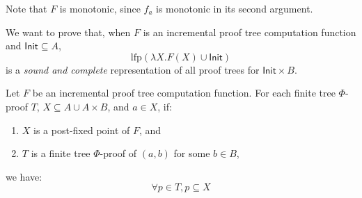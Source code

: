 \documentclass[12pt]{article}
\begin{document}
Note that $F$ is monotonic, since $f_a$ is monotonic in its second argument.

We want to prove that, when $F$ is an incremental proof tree computation function and $\mathsf{Init}\subseteq A$,
\[\text{lfp}(\lambda X.F(X)\cup\mathsf{Init})\]
is a \emph{sound and complete} representation of all proof trees for $\mathsf{Init}\times B$.

\begin{theorem}[Soundness]
	Let $F$ be an incremental proof tree computation function.
	For each finite tree $\Phi$-proof $T$, $X\subseteq A\cup A\times B$, and $a\in X$, if:
	\begin{enumerate}
		\item $X$ is a post-fixed point of $F$, and
		\item $T$ is a finite tree $\Phi$-proof of $(a,b)$ for some $b\in B$,
	\end{enumerate}
	we have:
	\[\forall p\in T,p\subseteq X\]
\end{theorem}
\end{document}

